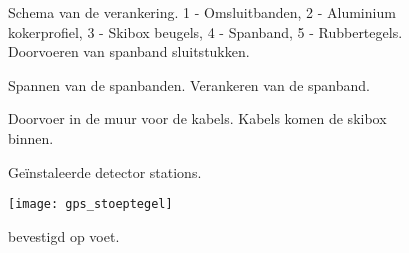 \begin{figure}
    \centering
    \caption{Schema van de verankering. 1 - Omsluitbanden, 2 - Aluminium
             kokerprofiel, 3 - Skibox beugels, 4 - Spanband, 5 -
             Rubbertegels. Doorvoeren van spanband sluitstukken.}
\end{figure}

\begin{figure}
    \centering
    \caption{Spannen van de spanbanden. Verankeren van de spanband.}
\end{figure}

\begin{figure}
    \centering
    \caption{Doorvoer in de muur voor de kabels. Kabels komen de skibox
             binnen.}
\end{figure}

\begin{figure}
    \centering
    \caption{Geïnstaleerde detector stations.}
\end{figure}

\begin{figure}
    \centering
    \texttt{[image: gps\_stoeptegel]}
    \label{fig:gps_stoeptegel}
    \caption{\gps bevestigd op voet.}
\end{figure}




